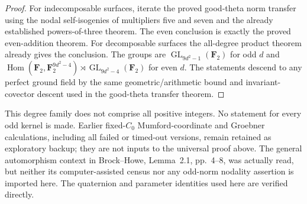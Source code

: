 \begin{proof}
For indecomposable surfaces, iterate the proved good-theta norm
transfer using the nodal self-isogenies of multipliers five and
seven and the already established powers-of-three theorem.
The even conclusion is exactly the proved even-addition theorem.
For decomposable surfaces the all-degree product theorem already
gives the conclusion. The groups are $\operatorname{GL}_{9d^2-1}
(\mathbf F_2)$ for odd $d$ and
$\operatorname{Hom}(\mathbf F_2,\mathbf F_2^{9d^2-4})\rtimes
\operatorname{GL}_{9d^2-4}(\mathbf F_2)$ for even $d$.
The statements descend to any perfect ground field by the same
geometric/arithmetic bound and invariant-covector descent used
in the good-theta transfer theorem.
\end{proof}

\begin{remark}
\label{rem:uniform-seven-scope-candidate}
This degree family does not comprise all positive integers.
No statement for every odd kernel is made. Earlier fixed-$C_0$
Mumford-coordinate and Groebner calculations, including all failed
or timed-out versions, remain retained as exploratory backup;
they are not inputs to the universal proof above. The general
automorphism context in Brock--Howe, Lemma~2.1, pp.~4--8, was
actually read, but neither its computer-assisted census nor any
odd-norm nodality assertion is imported here. The quaternion and
parameter identities used here are verified directly.
\end{remark}
